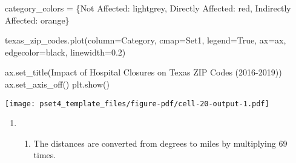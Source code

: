 \documentclass[
  letterpaper,
  DIV=11,
  numbers=noendperiod]{scrartcl}
\newenvironment{Shaded}{\begin{snugshade}}{\end{snugshade}}
\newcommand{\FloatTok}[1]{\textcolor[rgb]{0.68,0.00,0.00}{#1}}
\newcommand{\NormalTok}[1]{\textcolor[rgb]{0.00,0.23,0.31}{#1}}
\newcommand{\OperatorTok}[1]{\textcolor[rgb]{0.37,0.37,0.37}{#1}}
\newcommand{\StringTok}[1]{\textcolor[rgb]{0.13,0.47,0.30}{#1}}
\newcommand{\VariableTok}[1]{\textcolor[rgb]{0.07,0.07,0.07}{#1}}
\providecommand{\tightlist}{%
  \setlength{\itemsep}{0pt}\setlength{\parskip}{0pt}}\usepackage{longtable,booktabs,array}
\begin{document}
\begin{Shaded}
\begin{Highlighting}[]
\NormalTok{category\_colors }\OperatorTok{=}\NormalTok{ \{}\StringTok{\textquotesingle{}Not Affected\textquotesingle{}}\NormalTok{: }\StringTok{\textquotesingle{}lightgrey\textquotesingle{}}\NormalTok{,}
                   \StringTok{\textquotesingle{}Directly Affected\textquotesingle{}}\NormalTok{: }\StringTok{\textquotesingle{}red\textquotesingle{}}\NormalTok{, }\StringTok{\textquotesingle{}Indirectly Affected\textquotesingle{}}\NormalTok{: }\StringTok{\textquotesingle{}orange\textquotesingle{}}\NormalTok{\}}

\NormalTok{texas\_zip\_codes.plot(column}\OperatorTok{=}\StringTok{\textquotesingle{}Category\textquotesingle{}}\NormalTok{, cmap}\OperatorTok{=}\StringTok{\textquotesingle{}Set1\textquotesingle{}}\NormalTok{, legend}\OperatorTok{=}\VariableTok{True}\NormalTok{, ax}\OperatorTok{=}\NormalTok{ax,}
\NormalTok{                     edgecolor}\OperatorTok{=}\StringTok{\textquotesingle{}black\textquotesingle{}}\NormalTok{, linewidth}\OperatorTok{=}\FloatTok{0.2}\NormalTok{)}

\NormalTok{ax.set\_title(}\StringTok{\textquotesingle{}Impact of Hospital Closures on Texas ZIP Codes (2016{-}2019)\textquotesingle{}}\NormalTok{)}
\NormalTok{ax.set\_axis\_off()}
\NormalTok{plt.show()}
\end{Highlighting}
\end{Shaded}

\texttt{[image: pset4\_template\_files/figure-pdf/cell-20-output-1.pdf]}

\begin{enumerate}
\def\labelenumi{\arabic{enumi}.}
\setcounter{enumi}{4}
\tightlist
\item
  \begin{enumerate}
  \def\labelenumii{\alph{enumii}.}
  \tightlist
  \item
    The distances are converted from degrees to miles by multiplying 69
    times.
  \end{enumerate}
\end{enumerate}
\end{document}
